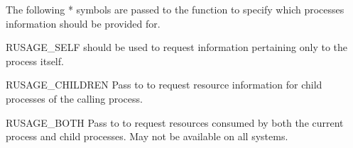 The following * symbols are passed to the
 function to specify which processes information
should be provided for.

\begin{datadesc}{RUSAGE_SELF}
   should be used to
  request information pertaining only to the process itself.
\end{datadesc}

\begin{datadesc}{RUSAGE_CHILDREN}
  Pass to  to request resource information for child
  processes of the calling process.
\end{datadesc}

\begin{datadesc}{RUSAGE_BOTH}
  Pass to  to request resources consumed by both the
  current process and child processes.  May not be available on all
  systems.
\end{datadesc}
